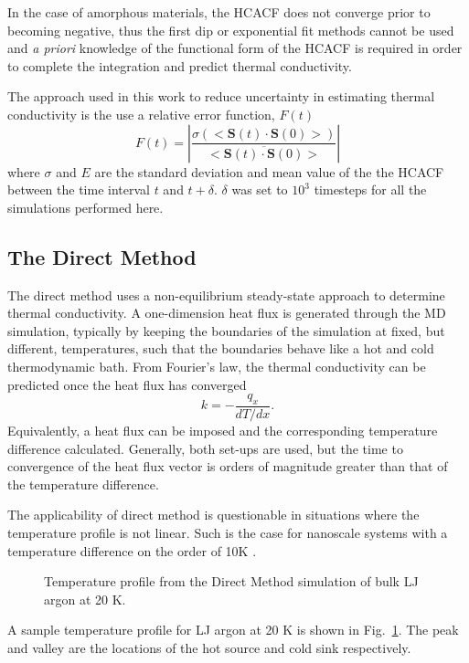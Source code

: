 In the case of amorphous materials, the HCACF does not converge prior to becoming negative, thus the first dip or exponential fit methods cannot be used and \textit{a priori} knowledge of the functional form of the HCACF is required in order to complete the integration and predict thermal conductivity.

The approach used in this work to reduce uncertainty in estimating thermal conductivity is the use a relative error function, $F(t)$ \cite{Chen20102392}
%
\begin{equation}\label{EQ:errfunc}
F(t)= \left\lvert\frac{\sigma(<\bm{S}(t)\cdot\bm{S}(0)>)}{\overline{<\bm{S}(t)\cdot\bm{S}(0)>}} \right\rvert
\end{equation}
%
where $\sigma$ and $E$ are the standard deviation and mean value of the the HCACF between the time interval $t$ and $t+\delta$. $\delta$ was set to $10^3$ timesteps for all the simulations performed here.

\subsection{The Direct Method}

The direct method uses a non-equilibrium steady-state approach to determine thermal conductivity. A one-dimension heat flux is generated through the MD simulation, typically by keeping the boundaries of the simulation at fixed, but different, temperatures, such that the boundaries behave like a hot and cold thermodynamic bath. From Fourier's law, the thermal conductivity can be predicted once the heat flux has converged
%
\begin{equation}\label{EQ:DM_k}
k=-\frac{q_x}{dT/dx}.
\end{equation}
%
Equivalently, a heat flux can be imposed and the corresponding temperature difference calculated. Generally, both set-ups are used, but the time to convergence of the heat flux vector is orders of magnitude greater than that of the temperature difference.

The applicability of direct method is questionable in situations where the temperature profile is not linear. Such is the case for nanoscale systems with a temperature difference on the order of 10K \cite{mcgaugheythesis}.
%
\begin{figure}
\begin{center}
\renewcommand{\figure}{Fig.}
\caption{Temperature profile from the Direct Method simulation of bulk LJ argon at 20 K.}
\label{FIG:DM_bulk}
\end{center}
\end{figure}
%
A sample temperature profile for LJ argon at 20 K is shown in Fig.~\ref{FIG:DM_bulk}. The peak and valley are the locations of the hot source and cold sink respectively.
%
